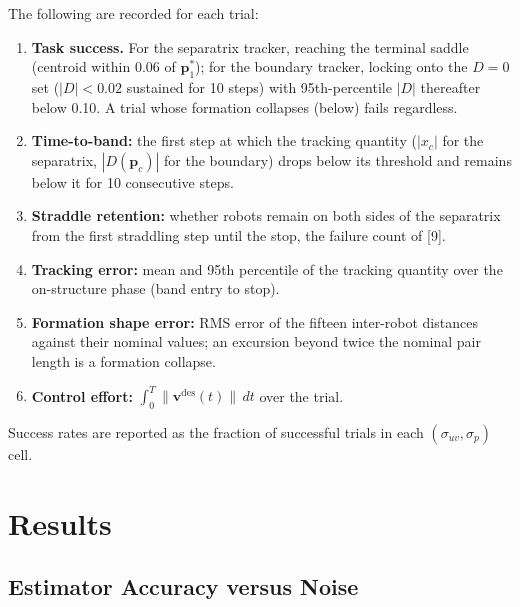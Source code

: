 \documentclass[lettersize,journal]{IEEEtran}
\begin{document}
The following are recorded for each trial:
\begin{enumerate}
    \item \textbf{Task success.} For the separatrix tracker, reaching
          the terminal saddle (centroid within 0.06 of
          $\mathbf{p}^*_1$); for the boundary tracker, locking onto the
          $D = 0$ set ($|D| < 0.02$ sustained for 10 steps) with
          95th-percentile $|D|$ thereafter below 0.10. A trial whose
          formation collapses (below) fails regardless.
    \item \textbf{Time-to-band:} the first step at which the tracking
          quantity ($|x_c|$ for the separatrix, $|D(\mathbf{p}_c)|$ for
          the boundary) drops below its threshold and remains below it
          for 10 consecutive steps.
    \item \textbf{Straddle retention:} whether robots remain on both
          sides of the separatrix from the first straddling step until
          the stop, the failure count of [9].
    \item \textbf{Tracking error:} mean and 95th percentile of the
          tracking quantity over the on-structure phase (band entry to
          stop).
    \item \textbf{Formation shape error:} RMS error of the fifteen
          inter-robot distances against their nominal values; an
          excursion beyond twice the nominal pair length is a formation
          collapse.
    \item \textbf{Control effort:} $\int_0^T \|\mathbf{v}^{\text{des}}(t)\|
          \,dt$ over the trial.
\end{enumerate}

Success rates are reported as the fraction of successful trials in each
$(\sigma_{uv}, \sigma_p)$ cell.


\section{Results}
\label{sec:results}

\subsection{Estimator Accuracy versus Noise}
\end{document}
